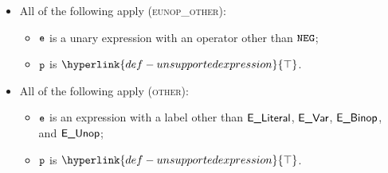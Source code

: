 \documentclass{book}
\newcommand\CannotBeTransformed[0]{\hyperlink{def-unsupportedexpression}{\top}}
\begin{document}
\begin{itemize}
  \item All of the following apply (\textsc{eunop\_other}):
  \begin{itemize}
    \item $\texttt{e}$ is a unary expression with an operator other than $\texttt{NEG}$;
    \item $\texttt{p}$ is $\CannotBeTransformed$.
  \end{itemize}

  \item All of the following apply (\textsc{other}):
  \begin{itemize}
    \item $\texttt{e}$ is an expression with a label other than $\textsf{E\_Literal}$, $\textsf{E\_Var}$, $\textsf{E\_Binop}$, and $\textsf{E\_Unop}$;
    \item $\texttt{p}$ is $\CannotBeTransformed$.
  \end{itemize}
\end{itemize}
\end{document}
